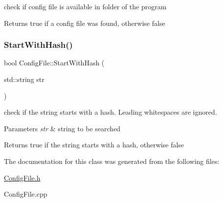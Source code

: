 check if config file is available in folder of the program 

\begin{DoxyReturn}{Returns}
true if a config file was found, otherwise false 
\end{DoxyReturn}
\mbox{\label{classConfigFile_a3be9deb6d7f24b7cff36d5746226a440}} 
\subsubsection{\texorpdfstring{Start\+With\+Hash()}{StartWithHash()}}
{\footnotesize\ttfamily bool Config\+File\+::\+Start\+With\+Hash (\begin{DoxyParamCaption}\item[{std\+::string}]{str }\end{DoxyParamCaption})\hspace{0.3cm}{\ttfamily [private]}}



check if the string starts with a hash. Leading whitespaces are ignored. 


\begin{DoxyParams}{Parameters}
{\em str} & string to be searched \\
\hline
\end{DoxyParams}
\begin{DoxyReturn}{Returns}
true if the string starts with a hash, otherwise false 
\end{DoxyReturn}


The documentation for this class was generated from the following files\+:\begin{DoxyCompactItemize}
\item 
\hyperlink{ConfigFile_8h}{Config\+File.\+h}\item 
Config\+File.\+cpp\end{DoxyCompactItemize}
